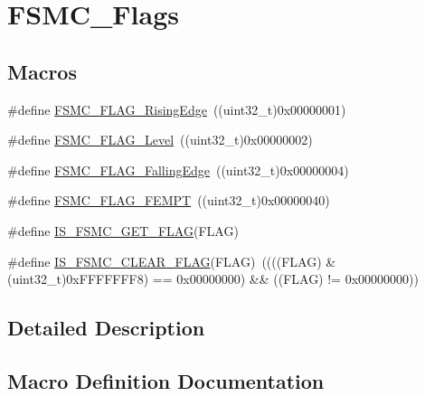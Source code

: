 \hypertarget{group___f_s_m_c___flags}{}\section{F\+S\+M\+C\+\_\+\+Flags}
\label{group___f_s_m_c___flags}
\subsection*{Macros}
\begin{DoxyCompactItemize}
\item 
\#define \mbox{\hyperlink{group___f_s_m_c___flags_ga5aadbd5d9f1b6a25bcc1fc6f3bf4c9cc}{F\+S\+M\+C\+\_\+\+F\+L\+A\+G\+\_\+\+Rising\+Edge}}~((uint32\+\_\+t)0x00000001)
\item 
\#define \mbox{\hyperlink{group___f_s_m_c___flags_ga25868d35780998a52190c424ebb3823f}{F\+S\+M\+C\+\_\+\+F\+L\+A\+G\+\_\+\+Level}}~((uint32\+\_\+t)0x00000002)
\item 
\#define \mbox{\hyperlink{group___f_s_m_c___flags_gaaaa85bce06ed962874686ad7af0f0cb7}{F\+S\+M\+C\+\_\+\+F\+L\+A\+G\+\_\+\+Falling\+Edge}}~((uint32\+\_\+t)0x00000004)
\item 
\#define \mbox{\hyperlink{group___f_s_m_c___flags_ga8da2bd0b9d11877aaebaba0c77e8b0cc}{F\+S\+M\+C\+\_\+\+F\+L\+A\+G\+\_\+\+F\+E\+M\+PT}}~((uint32\+\_\+t)0x00000040)
\item 
\#define \mbox{\hyperlink{group___f_s_m_c___flags_gab8674160ef7884f939e07041bbf5b18b}{I\+S\+\_\+\+F\+S\+M\+C\+\_\+\+G\+E\+T\+\_\+\+F\+L\+AG}}(F\+L\+AG)
\item 
\#define \mbox{\hyperlink{group___f_s_m_c___flags_ga1114bf56b54e726831b38fc8c5daa14e}{I\+S\+\_\+\+F\+S\+M\+C\+\_\+\+C\+L\+E\+A\+R\+\_\+\+F\+L\+AG}}(F\+L\+AG)~((((F\+L\+AG) \& (uint32\+\_\+t)0x\+F\+F\+F\+F\+F\+F\+F8) == 0x00000000) \&\& ((\+F\+L\+A\+G) != 0x00000000))
\end{DoxyCompactItemize}


\subsection{Detailed Description}


\subsection{Macro Definition Documentation}
\mbox{\label{group___f_s_m_c___flags_gaaaa85bce06ed962874686ad7af0f0cb7}} 
